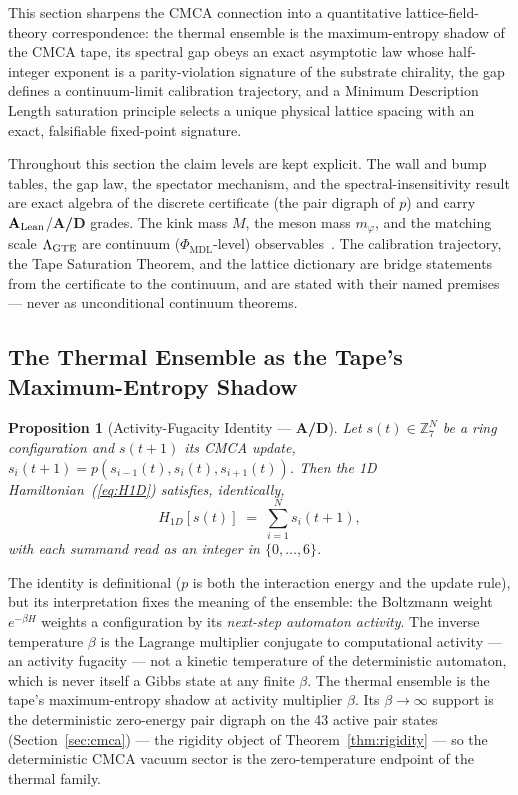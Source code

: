 \documentclass[11pt]{article}
\newtheorem{proposition}[theorem]{Proposition}
\theoremstyle{remark}
\newcommand{\PHIMDL}{\ensuremath{\Phi_{\mathrm{MDL}}}}
\newcommand{\CatAL}{\ensuremath{\textbf{A}_{\rm Lean}}}
\newcommand{\CatAD}{\textbf{A/D}}
\begin{document}
This section sharpens the CMCA connection into a quantitative
lattice-field-theory correspondence: the thermal ensemble is the
maximum-entropy shadow of the CMCA tape, its spectral gap obeys an exact
asymptotic law whose half-integer exponent is a parity-violation signature of
the substrate chirality, the gap defines a continuum-limit calibration
trajectory, and a Minimum Description Length saturation principle selects a
unique physical lattice spacing with an exact, falsifiable fixed-point
signature.

Throughout this section the claim levels are kept explicit. The wall and bump
tables, the gap law, the spectator mechanism, and the spectral-insensitivity
result are exact algebra of the discrete certificate (the pair digraph of $p$)
and carry \CatAL{}/\CatAD{} grades. The kink mass $M$, the meson mass
$m_\varphi$, and the matching scale $\Lambda_{\rm GTE}$ are continuum
($\PHIMDL{}$-level) observables~\cite{SpivackPhiMDLField,
SpivackGTEQCDStructure}. The calibration trajectory, the Tape Saturation
Theorem, and the lattice dictionary are bridge statements from the certificate
to the continuum, and are stated with their named premises --- never as
unconditional continuum theorems.

\subsection{The Thermal Ensemble as the Tape's Maximum-Entropy Shadow}
\label{sec:thermal-shadow}

\begin{proposition}[Activity-Fugacity Identity --- \CatAD{}]
\label{prop:activity}
Let $s(t) \in \mathbb{Z}_7^N$ be a ring configuration and $s(t+1)$ its CMCA
update, $s_i(t+1) = p(s_{i-1}(t), s_i(t), s_{i+1}(t))$. Then the 1D
Hamiltonian~(\ref{eq:H1D}) satisfies, identically,
\begin{equation}
  H_{1D}[s(t)] \;=\; \sum_{i=1}^{N} s_i(t+1),
\end{equation}
with each summand read as an integer in $\{0, \ldots, 6\}$.
\end{proposition}

The identity is definitional ($p$ is both the interaction energy and the
update rule), but its interpretation fixes the meaning of the ensemble: the
Boltzmann weight $e^{-\beta H}$ weights a configuration by its
\emph{next-step automaton activity}. The inverse temperature $\beta$ is the
Lagrange multiplier conjugate to computational activity --- an activity
fugacity --- not a kinetic temperature of the deterministic automaton, which
is never itself a Gibbs state at any finite $\beta$. The thermal ensemble is
the tape's maximum-entropy shadow at activity multiplier $\beta$. Its
$\beta \to \infty$ support is the deterministic zero-energy pair digraph on
the 43 active pair states (Section~\ref{sec:cmca}) --- the rigidity object of
Theorem~\ref{thm:rigidity} --- so the deterministic CMCA vacuum sector is the
zero-temperature endpoint of the thermal family.
\end{document}
